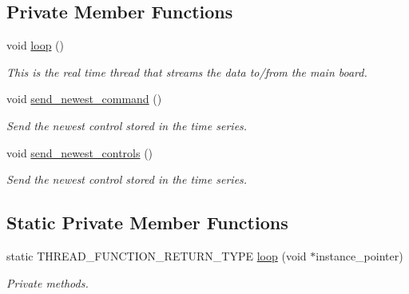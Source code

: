 \subsection*{Private Member Functions}
\begin{DoxyCompactItemize}
\item 
void \hyperlink{classblmc__drivers_1_1SpiBus_a21b3790ae435d8845c1a47e31d628cc9}{loop} ()\hypertarget{classblmc__drivers_1_1SpiBus_a21b3790ae435d8845c1a47e31d628cc9}{}\label{classblmc__drivers_1_1SpiBus_a21b3790ae435d8845c1a47e31d628cc9}

\begin{DoxyCompactList}\small\item\em This is the real time thread that streams the data to/from the main board. \end{DoxyCompactList}\item 
void \hyperlink{classblmc__drivers_1_1SpiBus_ad1332260ea455812464723ede9f2c1d1}{send\+\_\+newest\+\_\+command} ()
\begin{DoxyCompactList}\small\item\em Send the newest control stored in the time series. \end{DoxyCompactList}\item 
void \hyperlink{classblmc__drivers_1_1SpiBus_adedb766b0bcc857f3aa53e3468d4c02a}{send\+\_\+newest\+\_\+controls} ()\hypertarget{classblmc__drivers_1_1SpiBus_adedb766b0bcc857f3aa53e3468d4c02a}{}\label{classblmc__drivers_1_1SpiBus_adedb766b0bcc857f3aa53e3468d4c02a}

\begin{DoxyCompactList}\small\item\em Send the newest control stored in the time series. \end{DoxyCompactList}\end{DoxyCompactItemize}
\subsection*{Static Private Member Functions}
\begin{DoxyCompactItemize}
\item 
static T\+H\+R\+E\+A\+D\+\_\+\+F\+U\+N\+C\+T\+I\+O\+N\+\_\+\+R\+E\+T\+U\+R\+N\+\_\+\+T\+Y\+PE \hyperlink{classblmc__drivers_1_1SpiBus_a1838b3861afd142bb5db570841baada1}{loop} (void $\ast$instance\+\_\+pointer)
\begin{DoxyCompactList}\small\item\em Private methods. \end{DoxyCompactList}\end{DoxyCompactItemize}
